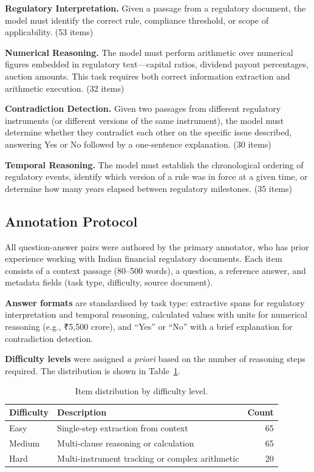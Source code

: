 \documentclass[11pt]{article}
\begin{document}
\textbf{Regulatory Interpretation.} Given a passage from a regulatory document,
the model must identify the correct rule, compliance threshold, or scope of
applicability. (53 items)

\textbf{Numerical Reasoning.} The model must perform arithmetic over numerical
figures embedded in regulatory text---capital ratios, dividend payout
percentages, auction amounts. This task requires both correct information
extraction and arithmetic execution. (32 items)

\textbf{Contradiction Detection.} Given two passages from different regulatory
instruments (or different versions of the same instrument), the model must
determine whether they contradict each other on the specific issue described,
answering Yes or No followed by a one-sentence explanation. (30 items)

\textbf{Temporal Reasoning.} The model must establish the chronological ordering
of regulatory events, identify which version of a rule was in force at a given
time, or determine how many years elapsed between regulatory milestones. (35 items)

\subsection{Annotation Protocol}

All question-answer pairs were authored by the primary annotator, who has prior
experience working with Indian financial regulatory documents. Each item consists
of a context passage (80--500 words), a question, a reference answer, and
metadata fields (task type, difficulty, source document).

\textbf{Answer formats} are standardised by task type: extractive spans for
regulatory interpretation and temporal reasoning, calculated values with units
for numerical reasoning (e.g., \textrm{₹}5{,}500 crore), and ``Yes'' or ``No''
with a brief explanation for contradiction detection.

\textbf{Difficulty levels} were assigned \textit{a priori} based on the number
of reasoning steps required. The distribution is shown in
Table~\ref{tab:difficulty}.

\begin{table}[h]
\centering
\caption{Item distribution by difficulty level.}
\label{tab:difficulty}
\begin{tabular}{llr}
\toprule
\textbf{Difficulty} & \textbf{Description} & \textbf{Count} \\
\midrule
Easy   & Single-step extraction from context & 65 \\
Medium & Multi-clause reasoning or calculation & 65 \\
Hard   & Multi-instrument tracking or complex arithmetic & 20 \\
\bottomrule
\end{tabular}
\end{table}
\end{document}
